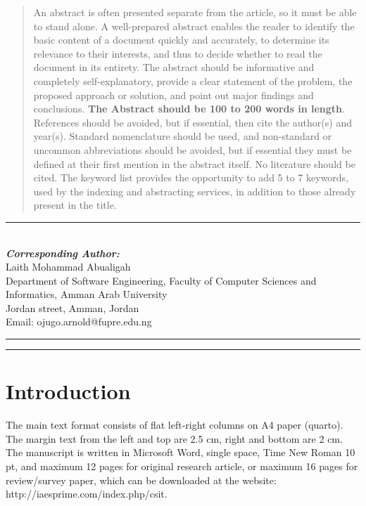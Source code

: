 \documentclass{iaesarticle}
\begin{document}
\parbox[t][][s]{0.65\textwidth}{%
\begin{abstract}
\vspace{.3em}
An abstract is often presented separate from the article, so it must be able to stand alone. A well-prepared abstract enables the reader to identify the basic content of a document quickly and accurately, to determine its relevance to their interests, and thus to decide whether to read the document in its entirety. The abstract should be informative and completely self-explanatory, provide a clear statement of the problem, the proposed approach or solution, and point out major findings and conclusions. \textbf{The Abstract should be 100 to 200 words in length}. References should be avoided, but if essential, then cite the author(s) and year(s). Standard nomenclature should be used, and non-standard or uncommon abbreviations should be avoided, but if essential they must be defined at their first mention in the abstract itself. No literature should be cited. The keyword list provides the opportunity to add 5 to 7 keywords, used by the indexing and abstracting services, in addition to those already present in the title.
\end{abstract}
}
\parbox[l]{\textwidth}{%
\rule{0.275\textwidth}{0.5pt} \hspace{0.5cm} \hrulefill
\\
\emph{\textbf{Corresponding Author:}}
\vspace{.5em}\\
Laith Mohammad Abualigah\\
Department of Software Engineering, Faculty of Computer Sciences and Informatics,
Amman Arab University\\
Jordan street, Amman, Jordan\\
Email: ojugo.arnold@fupre.edu.ng
}
\vspace{.5em}
\hrule
\vspace{.1em}
\hrule



\section{Introduction}
\label{}
The main text format consists of flat left-right columns on A4 paper (quarto). The margin text from the left and top are 2.5 cm, right and bottom are 2 cm. The manuscript is written in Microsoft Word, single space, Time New Roman 10 pt, and maximum 12 pages for original research article, or maximum 16 pages for review/survey paper, which can be downloaded at the website: http://iaesprime.com/index.php/csit.
\end{document}
